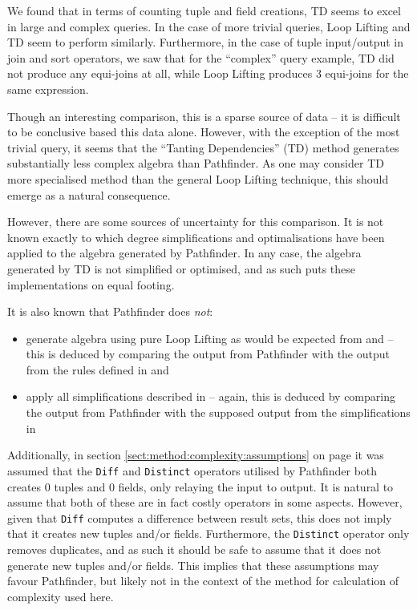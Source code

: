 We found that in terms of counting tuple and field creations, TD seems to excel
in large and complex queries. In the case of more trivial queries, Loop Lifting
and TD seem to perform similarly. Furthermore, in the case of tuple
input/output in join and sort operators, we saw that for the ``complex'' query
example, TD did not produce any equi-joins at all, while Loop Lifting produces 3
equi-joins for the same expression.

Though an interesting comparison, this is a sparse source of data -- it
is difficult to be conclusive based this data alone. However, with the
exception of the most trivial query, it seems that the ``Tanting Dependencies''
(TD) method generates substantially less complex algebra than Pathfinder. As one
may consider TD more specialised method than the general Loop Lifting
technique, this should emerge as a natural consequence.

However, there are some sources of uncertainty for this comparison. It is not
known exactly to which degree simplifications and optimalisations have been
applied to the algebra generated by Pathfinder. In any case, the
algebra generated by TD is not simplified or optimised, and as such puts these
implementations on equal footing. 

It is also known that Pathfinder does \emph{not}:
\begin{itemize}
  \item generate algebra using pure Loop Lifting as would be expected from
  \cite{pathfinder_mothertongue} and \cite{pathfinder_purelyRelational} -- this
  is deduced by comparing the output from Pathfinder with the output
  from the rules defined in \cite{pathfinder_mothertongue} and
  \cite{pathfinder_purelyRelational}
  \item apply all simplifications described in
  \cite{pathfinder_purelyRelational} -- again, this is deduced by comparing the
  output from Pathfinder with the supposed output from the simplifications in
  \cite{pathfinder_purelyRelational}
\end{itemize}

Additionally, in section \ref{sect:method:complexity:assumptions} on page
\pageref{sect:method:complexity:assumptions} it was assumed that
the \texttt{Diff} and \texttt{Distinct} operators utilised by Pathfinder both
creates 0 tuples and 0 fields, only relaying the input to output. It is
natural to assume that both of these are in fact costly operators in some
aspects. However, given that \texttt{Diff} computes a difference between
result sets, this does not imply that it creates new tuples and/or fields.
Furthermore, the \texttt{Distinct} operator only removes duplicates, and as
such it should be safe to assume that it does not generate new tuples and/or
fields. This implies that these assumptions may favour Pathfinder, but likely
not in the context of the method for calculation of complexity used here.

